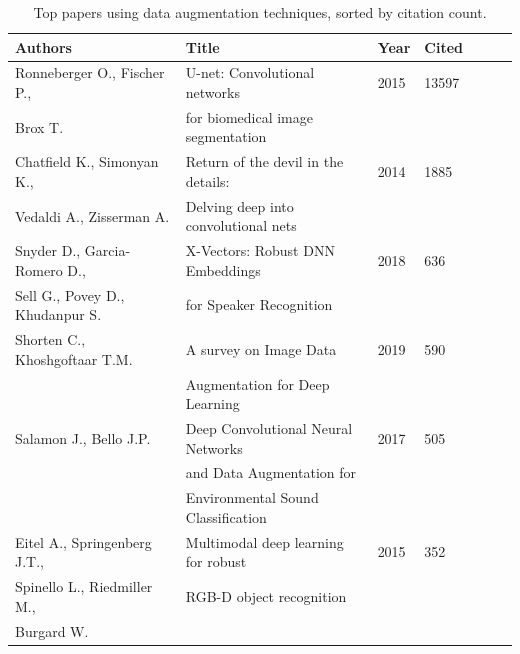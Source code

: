 \documentclass[pdflatex,sn-mathphys]{sn-jnl}%
\theoremstyle{thmstyleone}
\theoremstyle{thmstyletwo}
\theoremstyle{thmstylethree}
\begin{document}
\begin{table}[ht]
    \begin{center}
    \caption{\label{tab:top_papers}
        Top papers using data augmentation techniques, sorted by citation
        count.
    }
    \begin{tabular*}{\textwidth}{@{\extracolsep{\fill}}lllllll@{\extracolsep{\fill}}}
        \toprule
        Authors & Title & Year & Cited \\
        \midrule
        Ronneberger O., Fischer P., & U-net: Convolutional networks & 2015 & 13597 \\
        \vspace{.2cm}Brox T. & for biomedical image segmentation && \\

        Chatfield K., Simonyan K., & Return of the devil in the details: & 2014 & 1885 \\
        \vspace{.2cm}Vedaldi A., Zisserman A. & Delving deep into convolutional nets && \\

        Snyder D., Garcia-Romero D., & X-Vectors: Robust DNN Embeddings & 2018 & 636 \\
        \vspace{.2cm}Sell G., Povey D., Khudanpur S. & for Speaker Recognition && \\

        Shorten C., Khoshgoftaar T.M. & A survey on Image Data & 2019 & 590 \\
        \vspace{.2cm}                 & Augmentation for Deep Learning && \\

        Salamon J., Bello J.P. & Deep Convolutional Neural Networks & 2017 & 505 \\
                               & and Data Augmentation for \\
        \vspace{.2cm}          & Environmental Sound Classification \\

        Eitel A., Springenberg J.T., & Multimodal deep learning for robust & 2015 & 352 \\
        Spinello L., Riedmiller M., & RGB-D object recognition && \\
        \vspace{.2cm}Burgard W. &&& \\


\end{tabular*}
\end{center}
\end{table}
\end{document}
